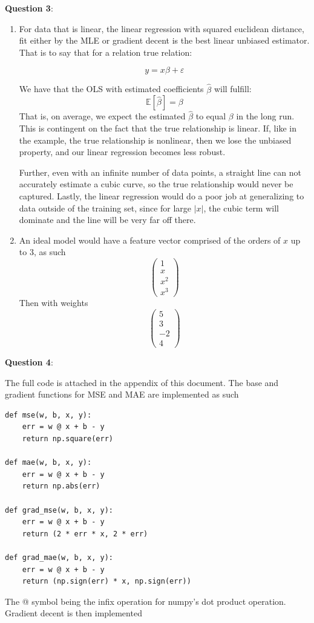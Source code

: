 \documentclass{article} %
\newcommand{\question}[2][]{
  \begin{flushleft}
    \textbf{Question #1}: \textit{#2}

\end{flushleft}}
\begin{document}
\question[3]{}
\begin{enumerate}
  \item
    For data that is linear, the linear regression with squared euclidean
    distance, fit either by the MLE or gradient decent is the best linear
    unbiased estimator. That is to say that for a relation true relation:

    $$
    y = x\beta + \varepsilon
    $$

    We have that the OLS with estimated coefficients $\hat\beta$ will fulfill:
    \[
      \mathbb{E}[\hat\beta] = \beta
    \]
    That is, on average, we expect the estimated $\hat\beta$ to equal
    $\beta$ in the long run. This is contingent on the fact that the true
    relationship is linear. If, like in the example, the true
    relationship is nonlinear, then we lose the unbiased property, and
    our linear regression becomes less robust.

    Further, even with an infinite number of data points, a straight line
    can not accurately estimate a cubic curve, so the true relationship
    would never be captured. Lastly, the linear regression would do a
    poor job at generalizing to data outside of the training set,
    since for large $|x|$, the cubic term will dominate and the line
    will be very far off there.
  \item An ideal model would have a feature vector comprised of the
    orders of $x$ up to $3$, as such
    $$
    \begin{pmatrix}
      1 \\
      x \\
      x^2 \\
      x^3
    \end{pmatrix}
    $$
    Then with weights
    \[
      \begin{pmatrix}
        5\\
        3 \\
        -2 \\
        4
      \end{pmatrix}
    \]
\end{enumerate}

\question[4]{ }
The full code is attached in the appendix of this document. The
base and gradient functions for MSE and MAE are implemented as such
\begin{verbatim}
def mse(w, b, x, y):
    err = w @ x + b - y
    return np.square(err)

def mae(w, b, x, y):
    err = w @ x + b - y
    return np.abs(err)

def grad_mse(w, b, x, y):
    err = w @ x + b - y
    return (2 * err * x, 2 * err)

def grad_mae(w, b, x, y):
    err = w @ x + b - y
    return (np.sign(err) * x, np.sign(err))
\end{verbatim}
The @ symbol being the infix operation for numpy's dot product
operation. Gradient decent is then implemented
\end{document}
